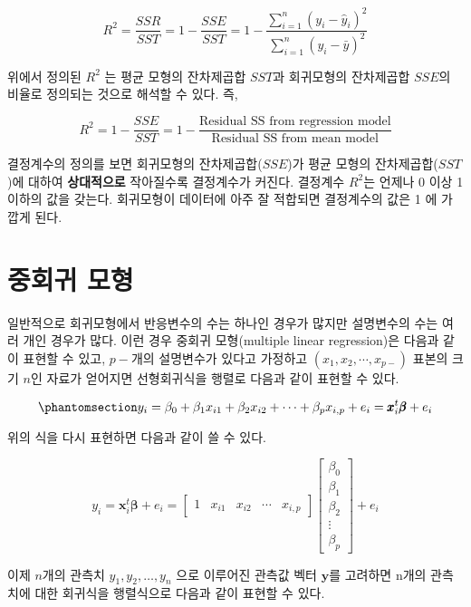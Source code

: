 \documentclass[
  11pt,
  a4paper,
  oneside]{scrbook}
\theoremstyle{definition}
\theoremstyle{plain}
\theoremstyle{definition}
\theoremstyle{definition}
\theoremstyle{remark}
\begin{document}
\[ 
R^2 = \frac{SSR}{SST} =  1 -\frac{SSE}{SST}  =1- \frac{\sum^n_{i=1}(y_i-\hat y_i)^2}{ \sum^n_{i=1}(y_i - \bar y)^2} 
\]

위에서 정의된 \(R^2\) 는 평균 모형의 잔차제곱합 \(SST\)과 회귀모형의
잔차제곱합 \(SSE\)의 비율로 정의되는 것으로 해석할 수 있다. 즉,

\[  
R^2 = 1 -\frac{SSE}{SST} =1 -\frac{\text{Residual SS from regression model}}{\text{Residual SS from mean model}} 
\]

결정계수의 정의를 보면 회귀모형의 잔차제곱합(\(SSE\))가 평균 모형의
잔차제곱합(\(SST\))에 대하여 \textbf{상대적으로} 작아질수록 결정계수가
커진다. 결정계수 \(R^2\)는 언제나 0 이상 1 이하의 값을 갖는다.
회귀모형이 데이터에 아주 잘 적합되면 결정계수의 값은 1 에 가깝게 된다.

\section{중회귀 모형}\label{uxc911uxd68cuxadc0-uxbaa8uxd615}

일반적으로 회귀모형에서 반응변수의 수는 하나인 경우가 많지만 설명변수의
수는 여러 개인 경우가 많다. 이런 경우 중회귀 모형(multiple linear
regression)은 다음과 같이 표현할 수 있고, \(p-\)개의 설명변수가 있다고
가정하고 \((x_1, x_2, \cdots, x_{p-})\) 표본의 크기 \(n\)인 자료가
얻어지면 선형회귀식을 행렬로 다음과 같이 표현할 수 있다.

\begin{equation}\phantomsection\label{eq-multireg1}{
y_i = \beta_0 + \beta_1 x_{i1} + \beta_2 x_{i2} + \cdots + \beta_{p} x_{i,p} +  e_i = \pmb x^t_i \pmb \beta +  e_i 
}\end{equation}

위의 식을 다시 표현하면 다음과 같이 쓸 수 있다.

\[ 
y_i  = \pmb x^t_i \pmb \beta  + e_i  =
\begin{bmatrix}
1 & x_{i1} & x_{i2} & \cdots & x_{i,p}
\end{bmatrix}
\begin{bmatrix}
\beta_{0} \\
\beta_{1} \\
\beta_{2} \\
\vdots \\
\beta_{p}
\end{bmatrix}
+ e_i
\]

이제 \(n\)개의 관측치 \(y_1,y_2, \dots, y_n\) 으로 이루어진 관측값 벡터
\(\pmb y\)를 고려하면 n개의 관측치에 대한 회귀식을 행렬식으로 다음과
같이 표현할 수 있다.
\end{document}
